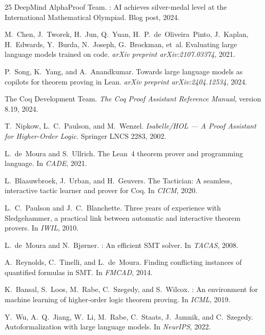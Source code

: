\documentclass[11pt]{article}
\begin{document}
\begin{thebibliography}{25}
{DeepMind AlphaProof Team}.
: AI achieves silver-medal level at the
  {International Mathematical Olympiad}.
\newblock Blog post, 2024.

M.~Chen, J.~Tworek, H.~Jun, Q.~Yuan, H.~P.~de~Oliveira~Pinto,
  J.~Kaplan, H.~Edwards, Y.~Burda, N.~Joseph, G.~Brockman, et~al.
\newblock Evaluating large language models trained on code.
\newblock \emph{arXiv preprint arXiv:2107.03374}, 2021.

P.~Song, K.~Yang, and A.~Anandkumar.
\newblock Towards large language models as copilots for theorem proving
  in {Lean}.
\newblock \emph{arXiv preprint arXiv:2404.12534}, 2024.

{The Coq Development Team}.
\newblock \emph{The {Coq} Proof Assistant Reference Manual}, version 8.19,
  2024.

T.~Nipkow, L.~C.~Paulson, and M.~Wenzel.
\newblock \emph{Isabelle/HOL — A Proof Assistant for Higher-Order Logic}.
\newblock Springer LNCS 2283, 2002.

L.~de~Moura and S.~Ullrich.
\newblock The {Lean~4} theorem prover and programming language.
\newblock In \emph{CADE}, 2021.

L.~Blaauwbroek, J.~Urban, and H.~Geuvers.
\newblock The {Tactician}: A seamless, interactive tactic learner and
  prover for {Coq}.
\newblock In \emph{CICM}, 2020.

L.~C.~Paulson and J.~C.~Blanchette.
\newblock Three years of experience with {Sledgehammer}, a practical link
  between automatic and interactive theorem provers.
\newblock In \emph{IWIL}, 2010.

L.~de~Moura and N.~Bj{\o}rner.
: An efficient {SMT} solver.
\newblock In \emph{TACAS}, 2008.

A.~Reynolds, C.~Tinelli, and L.~de~Moura.
\newblock Finding conflicting instances of quantified formulas in {SMT}.
\newblock In \emph{FMCAD}, 2014.

K.~Bansal, S.~Loos, M.~Rabe, C.~Szegedy, and S.~Wilcox.
: An environment for machine learning of higher-order
  logic theorem proving.
\newblock In \emph{ICML}, 2019.

Y.~Wu, A.~Q.~Jiang, W.~Li, M.~Rabe, C.~Staats, J.~Jamnik, and
  C.~Szegedy.
\newblock Autoformalization with large language models.
\newblock In \emph{NeurIPS}, 2022.


\end{thebibliography}
\end{document}
